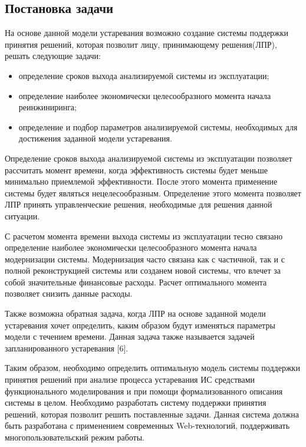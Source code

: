 \subsection{Постановка задачи}
На основе данной модели устаревания возможно создание системы поддержки принятия решений, которая позволит лицу, принимающему решения(ЛПР), решать следующие задачи:
\begin{itemize}
    \item определение сроков выхода анализируемой системы из эксплуатации;
    \item определение наиболее экономически целесообразного момента начала реинжиниринга;
    \item определение и подбор параметров анализируемой системы, необходимых для достижения заданной модели устаревания.
\end{itemize}

Определение сроков выхода анализируемой системы из эксплуатации позволяет рассчитать момент времени, когда эффективность системы будет меньше минимально приемлемой эффективности. 
После этого момента применение системы будет являться нецелесообразным. Определение этого момента позволяет ЛПР принять управленческие решения, необходимые для решения данной ситуации.

С расчетом момента времени выхода системы из эксплуатации тесно связано определение наиболее экономически целесообразного момента начала модернизации системы. 
Модернизация часто связана как с частичной, так и с полной реконструкцией системы или созданем новой системы, что влечет за собой значительные финансовые расходы. 
Расчет оптимального момента позволяет снизить данные расходы.

Также возможна обратная задача, когда ЛПР на основе заданной модели устаревания хочет определить, каким образом будут изменяться параметры модели с течением времени. 
Данная задача также называется задачей запланированного устаревания [6].

Таким образом, необходимо определить оптимальную модель системы поддержки принятия решений при анализе процесса устаревания ИС средствами функционального моделирования и при помощи формализованного описания системы в целом. 
Необходимо разработать систему поддержки принятия решений, которая позволит решить поставленные задачи. 
Данная система должна быть разработана с применением современных Web-технологий, поддерживать многопользовательский режим работы.

